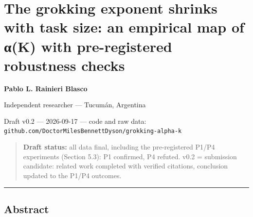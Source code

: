 \documentclass[
  11pt,
]{article}
\author{}
\date{}
\begin{document}
\section{The grokking exponent shrinks with task size: an empirical map
of α(K) with pre-registered robustness
checks}\label{the-grokking-exponent-shrinks-with-task-size-an-empirical-map-of-ux3b1k-with-pre-registered-robustness-checks}

\textbf{Pablo L. Rainieri Blasco}

Independent researcher --- Tucumán, Argentina

Draft v0.2 --- 2026-09-17 --- code and raw data:
\texttt{github.com/DoctorMilesBennettDyson/grokking-alpha-k}

\begin{quote}
\textbf{Draft status:} all data final, including the pre-registered
P1/P4 experiments (Section 5.3): P1 confirmed, P4 refuted. v0.2 =
submission candidate: related work completed with verified citations,
conclusion updated to the P1/P4 outcomes.
\end{quote}

\begin{center}\rule{0.5\linewidth}{0.5pt}\end{center}

\subsection{Abstract}\label{abstract}
\end{document}
